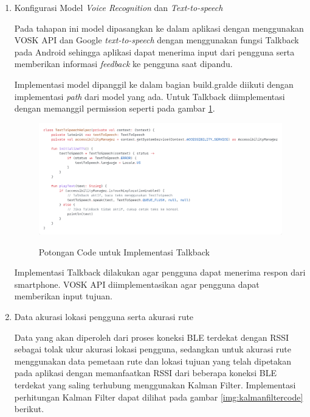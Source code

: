 	\begin{enumerate}
	
	\item Konfigurasi Model \textit{Voice Recognition} dan \textit{Text-to-speech}
	\par Pada tahapan ini model dipasangkan ke dalam aplikasi dengan menggunakan VOSK API dan Google \textit{text-to-speech} dengan menggunakan fungsi Talkback pada Android sehingga aplikasi dapat menerima input dari pengguna serta memberikan informasi \textit{feedback} ke pengguna saat dipandu.
	\par Implementasi model dipanggil ke dalam bagian build.gralde diikuti dengan implementasi \textit{path} dari model yang ada. Untuk Talkback diimplementasi dengan memanggil permission seperti pada gambar \ref{img:talkbackcode}.
	
	\begin{figure}[H]
\centering
{\includegraphics [scale = 0.2]{gambar/bab4/talkback}}
\caption{Potongan Code untuk Implementasi Talkback}
\label{img:talkbackcode}
\end{figure}
	
	\par Implementasi Talkback dilakukan agar pengguna dapat menerima respon dari smartphone. VOSK API diimplementasikan agar pengguna dapat memberikan input tujuan.
	
	\newpage
	\item  Data akurasi lokasi pengguna serta akurasi rute
\par Data yang akan diperoleh dari proses koneksi BLE terdekat dengan RSSI sebagai tolak ukur akurasi lokasi pengguna, sedangkan untuk akurasi rute menggunakan data pemetaan rute dan lokasi tujuan yang telah dipetakan pada aplikasi dengan memanfaatkan RSSI dari beberapa koneksi BLE terdekat yang saling terhubung menggunakan Kalman Filter. Implementasi perhitungan Kalman Filter dapat dilihat pada gambar \ref{img:kalmanfiltercode} berikut. 


\end{enumerate}
